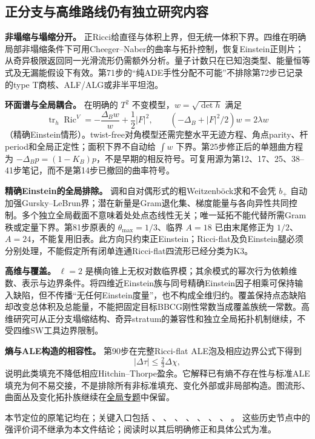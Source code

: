 \documentclass[UTF8,a4paper,11pt,fontset=fandol]{ctexart}
\numberwithin{equation}{section}
\theoremstyle{definition}
\newcommand{\Ric}{\operatorname{Ric}}
\newcommand{\tr}{\operatorname{tr}}
\begin{document}
\subsection{正分支与高维路线仍有独立研究内容}
\textbf{非塌缩与塌缩分开。} 正Ricci给直径与体积上界，但无统一体积下界。四维在明确局部非塌缩条件下可用Cheeger--Naber的曲率与拓扑控制，恢复Einstein正则片；从奇异极限返回同一光滑流形仍需额外分析。量子计数只在已知泡类型、能量恒等式及无漏能假设下有效。第71步的“纯ADE手性分配不可能”不排除第72步已记录的type T商核、ALF/ALG或非半平坦泡。

\textbf{环面谱与全局耦合。} 在明确的 $T^2$ 不变模型，$w=\sqrt{\det h}$ 满足
\[
\tr_h\Ric^{V}=-\frac{\Delta_Bw}{w}+\frac12|F|^2,
\qquad (-\Delta_B+|F|^2/2)w=2\lambda w
\]
（精确Einstein情形）。twist-free对角模型还需完整水平无迹方程、角点parity、杆period和全局正定性；面积下界不自动给 $\int w$ 下界。第25步修正后的单翘曲方程为 $-\Delta_Bp=(1-K_B)p$，不是早期的相反符号。可复用源为第12、17、25、38--41步笔记，而不是第14步已撤回的曲率符号。

\textbf{精确Einstein的全局排除。} 调和自对偶形式的粗Weitzenböck求和不会凭 $b_+$ 自动加强Gursky--LeBrun界；潜在新量是Gram退化集、梯度能量与各向异性共同控制。多个独立全局截面不意味着处处点态线性无关；唯一延拓不能代替所需Gram秩或定量下界。第81步原表的 $\theta_{\max}=1/3$、临界 $A=18$ 已由末尾修正为 $1/2$、$A=24$，不能复用旧表。此方向只约束正Einstein；Ricci-flat及负Einstein腿必须分别处理，不能假定所有闭单连通Ricci-flat四流形已经分类为K3。

\textbf{高维与覆盖。} $\ell=2$ 是横向锥上无权对数临界模；其余模式的幂次行为依赖维数、表示与边界条件。将四维近Einstein族与同号精确Einstein因子相乘可保持输入缺陷，但不传播“无任何Einstein度量”，也不构成全维归约。覆盖保持点态缺陷却改变总体积及总能量，不能把固定目标BBCG刚性常数当成覆盖族统一常数。高维研究可从正分支塌缩结构、奇异stratum的兼容性和独立全局拓扑机制继续，不受四维SW工具边界限制。

\textbf{熵与ALE构造的相容性。} 第90步在完整Ricci-flat ALE泡及相应边界公式下得到
\[
|\Delta\tau|\le\tfrac23\Delta\chi,
\]
说明此类填充不降低相应Hitchin--Thorpe盈余。它解释已有熵不存在性与标准ALE填充为何不易交接，不是排除所有非标准填充、变化外部或非局部构造。图流形、曲面丛及变化拓扑族继续在\href{20260916_global.tex}{全局专题}中保留。

本节定位的原笔记均在；关键入口包括
、
、
、
、
、
、
、
。
这些历史节点中的强评价词不继承为本文件结论；阅读时以其后明确修正和具体公式为准。
\end{document}
